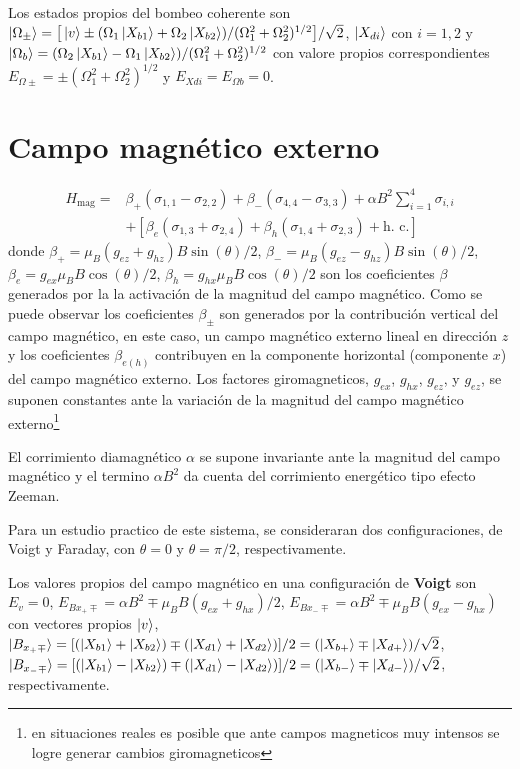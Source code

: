 \documentclass[main.tex]{subfiles}
\begin{document}
Los estados propios del bombeo coherente son $|\Omega_\pm\rangle = \big[\ket{v} \pm (\Omega_1 \ket{X_{b1}} + \Omega_2 \ket{X_{b2}})/(\Omega_1^2 + \Omega_2^2)^{1/2} \big]/\sqrt{2}$, $\ket{X_{di}}$ con $i=1,2$ y $\ket{\Omega_b} = (\Omega_2 \ket{X_{b1}} - \Omega_1 \ket{X_{b2}})/(\Omega_1^2 + \Omega_2^2)^{1/2}$ con valore propios correspondientes $E_{\Omega\pm} = \pm(\Omega_1^2+\Omega_2^2)^{1/2}$ y $E_{Xdi} = E_{\Omega b} = 0$.
\section{Campo magnético externo}
\begin{align*}
	H_\text{mag} =& \beta_+ (\sigma_{1, 1} - \sigma_{2, 2}) + \beta_- (\sigma_{4, 4} - \sigma_{3, 3}) + \alpha B^2 \sum_{i = 1}^{4} \sigma_{i, i}\\ &+ [\beta_e (\sigma_{1, 3} + \sigma_{2, 4}) + \beta_h (\sigma_{1, 4} + \sigma_{2, 3}) + \text{h. c.}]
\end{align*}
donde $\beta_+ = \mu_B (g_{ez} + g_{hz}) B \sin(\theta)/2$, $\beta_- = \mu_B (g_{ez}-g_{hz}) B \sin(\theta)/2$, $\beta_e = g_{ex} \mu_B B \cos(\theta)/2$, $\beta_h = g_{hx} \mu_B B \cos(\theta)/2$ son los coeficientes $\beta$ generados por la la activación de la magnitud del campo magnético. Como se puede observar los coeficientes $\beta_\pm$ son generados por la contribución vertical del campo magnético, en este caso, un campo magnético externo lineal en dirección $z$ y los coeficientes $\beta_{e(h)}$ contribuyen en la componente horizontal (componente $x$) del campo magnético externo. Los factores giromagneticos, $g_{ex}$, $g_{hx}$, $g_{ez}$, y $g_{ez}$, se suponen constantes ante la variación de la magnitud del campo magnético externo\footnote{en situaciones reales es posible que ante campos magneticos muy intensos se logre generar cambios giromagneticos}

El corrimiento diamagnético $\alpha$ se supone invariante ante la magnitud del campo magnético y el termino $\alpha B^2$ da cuenta del corrimiento energético tipo efecto Zeeman.

Para un estudio practico de este sistema, se consideraran dos configuraciones, de Voigt y Faraday, con $\theta=0$ y $\theta=\pi/2$, respectivamente. 

Los valores propios del campo magnético en una configuración de \textbf{Voigt} son $E_v=0$, $E_{Bx_+\mp} = \alpha B^2 \mp \mu_B B(g_{ex}+g_{hx})/2$, $E_{Bx_-\mp} = \alpha B^2 \mp \mu_B B (g_{ex} - g_{hx})$ con vectores propios $\ket{v}$, $\ket{B_{x_+\mp}} = [(\ket{X_{b1}}+\ket{X_{b2}}) \mp (\ket{X_{d1}}+\ket{X_{d2}})]/2 = (\ket{X_{b+}} \mp \ket{X_{d+}})/\sqrt{2}$, $\ket{B_{x_-\mp}} = [(\ket{X_{b1}}-\ket{X_{b2}}) \mp (\ket{X_{d1}}-\ket{X_{d2}})]/2 = (\ket{X_{b-}} \mp \ket{X_{d-}})/\sqrt{2}$, respectivamente.
\end{document}
